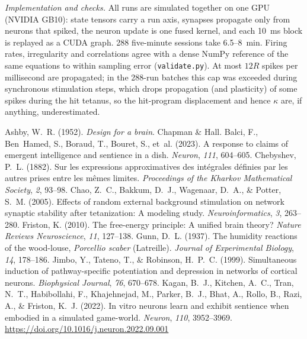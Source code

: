 \documentclass[12pt]{article}
\numberwithin{equation}{section}
\begin{document}
\emph{Implementation and checks.} All runs are simulated together on one GPU (NVIDIA GB10): state tensors carry a run axis, synapses propagate only from neurons that spiked, the neuron update is one fused kernel, and each 10~ms block is replayed as a CUDA graph. 288 five-minute sessions take 6.5--8~min. Firing rates, irregularity and correlations agree with a dense NumPy reference of the same equations to within sampling error (\texttt{validate.py}). At most $12R$ spikes per millisecond are propagated; in the 288-run batches this cap was exceeded during synchronous stimulation steps, which drops propagation (and plasticity) of some spikes during the hit tetanus, so the hit-program displacement and hence $\kappa$ are, if anything, underestimated.

\begin{thebibliography}{}
\small\singlespacing
{} Ashby, W.~R. (1952). \emph{Design for a brain}. Chapman \& Hall.
 Balci, F., Ben~Hamed, S., Boraud, T., Bouret, S., et~al. (2023). A response to claims of emergent intelligence and sentience in a dish. \emph{Neuron}, \emph{111}, 604--605.
 Chebyshev, P.~L. (1882). Sur les expressions approximatives des int\'egrales d\'efinies par les autres prises entre les m\^emes limites. \emph{Proceedings of the Kharkov Mathematical Society}, \emph{2}, 93--98.
 Chao, Z.~C., Bakkum, D.~J., Wagenaar, D.~A., \& Potter, S.~M. (2005). Effects of random external background stimulation on network synaptic stability after tetanization: A modeling study. \emph{Neuroinformatics}, \emph{3}, 263--280.
 Friston, K. (2010). The free-energy principle: A unified brain theory? \emph{Nature Reviews Neuroscience}, \emph{11}, 127--138.
 Gunn, D.~L. (1937). The humidity reactions of the wood-louse, \emph{Porcellio scaber} (Latreille). \emph{Journal of Experimental Biology}, \emph{14}, 178--186.
 Jimbo, Y., Tateno, T., \& Robinson, H.~P.~C. (1999). Simultaneous induction of pathway-specific potentiation and depression in networks of cortical neurons. \emph{Biophysical Journal}, \emph{76}, 670--678.
 Kagan, B.~J., Kitchen, A.~C., Tran, N.~T., Habibollahi, F., Khajehnejad, M., Parker, B.~J., Bhat, A., Rollo, B., Razi, A., \& Friston, K.~J. (2022). In vitro neurons learn and exhibit sentience when embodied in a simulated game-world. \emph{Neuron}, \emph{110}, 3952--3969. \url{https://doi.org/10.1016/j.neuron.2022.09.001}

\end{thebibliography}
\end{document}

